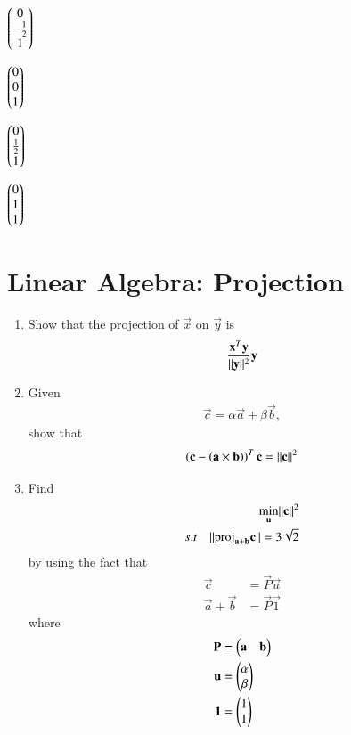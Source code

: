 \documentclass[journal,12pt,twocolumn]{IEEEtran}
\renewcommand\thesection{\arabic{section}}
\begin{document}
\begin{enumerate}[label=\thesection.\arabic*
,ref=\thesection.\theenumi]
\begin{enumerate}
\begin{multicols}{2}
\setlength\itemsep{1em}
\item $\begin{pmatrix}0\\-\frac{1}{2} \\ 1\end{pmatrix}$
\item $\begin{pmatrix}0\\ 0\\1\end{pmatrix}$
\item $\begin{pmatrix}0\\ \frac{1}{2} \\1\end{pmatrix}$
\item $\begin{pmatrix}0\\1 \\1\end{pmatrix}$
\end{multicols}
\end{enumerate}
\end{enumerate}
\section{Linear Algebra: Projection}
\begin{enumerate}[label=\thesection.\arabic*
,ref=\thesection.\theenumi]
\item Show that the projection of $\vec{x}$ on $\vec{y}$ is
\begin{align}
\label{eq:2019_qp2_14_proj}
\frac{\mathbf{x}^T\mathbf{y}}{\lVert\mathbf{y}\rVert^2}\mathbf{y}
\end{align}
\item Given 
\begin{align}
\label{eq:2019_qp2_14_cab}
\vec{c} = \alpha \vec{a}+\beta\vec{b},
\end{align}
show that 
\begin{align}
\left(\mathbf{c}-\left(\mathbf{a}\times\mathbf{b}\right)\right)^{T}\mathbf{c} = \lVert\mathbf{c}\rVert^2
\end{align}
%
%
\item Find 
\begin{align}
\label{eq:2019_qp2_14_prob}
\min_{\mathbf{u}} \lVert\mathbf{c}\rVert^2
\\
s.t \quad 
\lVert\text{proj}_{\mathbf{a}+\mathbf{b}}\mathbf{c}\rVert = 3\sqrt{2}
\label{eq:2019_qp2_14_const}
\end{align}
%
by using the fact that 
\begin{align}
\vec{c}&=\vec{P}\vec{u}
\\
\vec{a}+\vec{b} &= \vec{P}\vec{1}
\end{align}
%
where 
\begin{align}
\mathbf{P} &= \begin{pmatrix}\mathbf{a} &\mathbf{b}\end{pmatrix}
\\
\mathbf{u} &= \begin{pmatrix}\alpha \\ \beta\end{pmatrix}
\\
\mathbf{1} &= \begin{pmatrix}1 \\ 1\end{pmatrix}
\end{align}
\end{enumerate}
\end{document}
